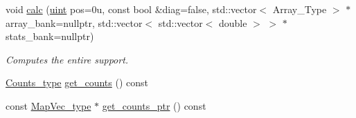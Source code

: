 \begin{DoxyCompactItemize}
\item 
void \hyperlink{class_support_ab5261952be0746f188ee024e3e8c26c1}{calc} (\hyperlink{typedefs_8hpp_a91ad9478d81a7aaf2593e8d9c3d06a14}{uint} pos=0u, const bool \&diag=false, std\+::vector$<$ Array\+\_\+\+Type $>$ $\ast$array\+\_\+bank=nullptr, std\+::vector$<$ std\+::vector$<$ double $>$ $>$ $\ast$stats\+\_\+bank=nullptr)
\begin{DoxyCompactList}\small\item\em Computes the entire support. \end{DoxyCompactList}\item 
\hyperlink{typedefs_8hpp_aee40fa17c1fddb63dd1f2b1470ade95b}{Counts\+\_\+type} \hyperlink{class_support_a00ebb01a467b41e4b65df4c9a916909b}{get\+\_\+counts} () const
\item 
const \hyperlink{typedefs_8hpp_a02ed8dec96bc528c8bc3d8cb3c4674a5}{Map\+Vec\+\_\+type} $\ast$ \hyperlink{class_support_a170776abc15d0fa8e02df36268e900a7}{get\+\_\+counts\+\_\+ptr} () const
\end{DoxyCompactItemize}
